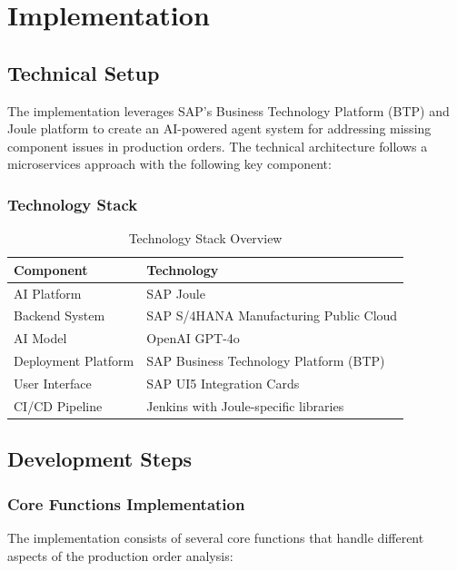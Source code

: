 \chapter{Implementation}
\label{chap:Implementation}

\section{Technical Setup}

The implementation leverages SAP's Business Technology Platform (BTP) and Joule platform to create an AI-powered agent system for addressing missing component issues in production orders. The technical architecture follows a microservices approach with the following key component:

\subsection{Technology Stack}

\begin{table}[h]
\centering
\begin{tabular}{@{}ll@{}}
\toprule
\textbf{Component} & \textbf{Technology} \\
\midrule
AI Platform & SAP Joule \\
Backend System & SAP S/4HANA Manufacturing Public Cloud \\
AI Model & OpenAI GPT-4o \\
Deployment Platform & SAP Business Technology Platform (BTP) \\
User Interface & SAP UI5 Integration Cards \\
CI/CD Pipeline & Jenkins with Joule-specific libraries \\
\bottomrule
\end{tabular}
\caption{Technology Stack Overview}
\end{table}


\section{Development Steps}

\subsection{Core Functions Implementation}

The implementation consists of several core functions that handle different aspects of the production order analysis:

